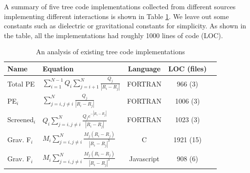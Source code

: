 \documentclass[draftclsnofoot]{elsarticle}
\begin{document}
A summary of five tree code implementations collected from different sources \cite{code1,code2, code3} implementing different
interactions is shown in  Table \ref{tbl_treecodes}. We leave out some constants such as dielectric or gravitational constants for simplicity.
As shown in the table, all the implementations had roughly 1000 lines of code (LOC).  

\begin{table}[!t]
\caption{An analysis of existing tree code implementations}
\label{tbl_treecodes}
\centering
\begin{tabular}{|l|l|c|c|c|}
\hline
Name & Equation & Language & LOC (files) \\
\hline \hline
Total PE
 & $\sum \limits_{i=1}^{N-1} Q_i\sum \limits_{j=i+1}^{N} \frac{Q_j}{|R_i-R_j|}$ & FORTRAN & 966 (3) \\
PE$_i$ &       $  \sum \limits_{j=i, j\ne i}^{N} \frac{Q_j}{|R_i-R_j|}$                              & FORTRAN & 1006 (3) \\
Screened$_i$ &    $Q_i\sum \limits_{j=i, j\ne i}^{N} \frac{Q_je^{-|R_i-R_j|}}{|R_i- R_j|}$ & FORTRAN & 1023 (3) \\
Grav. F$_i$
& $M_i\sum \limits_{j=i, j\ne i}^{N} \frac{M_j{(R_i- R_j)}}{{|R_i-R_j|}^3}$ & C & 1921 (15) \\
Grav. F$_i$
 & $M_i\sum \limits_{j=i, j\ne i}^{N} \frac{M_j{(R_i- R_j)}}{{|R_i-R_j|}^3}$ & Javascript & 908 (6) \\
\hline
\end{tabular}
\end{table}
\end{document}
